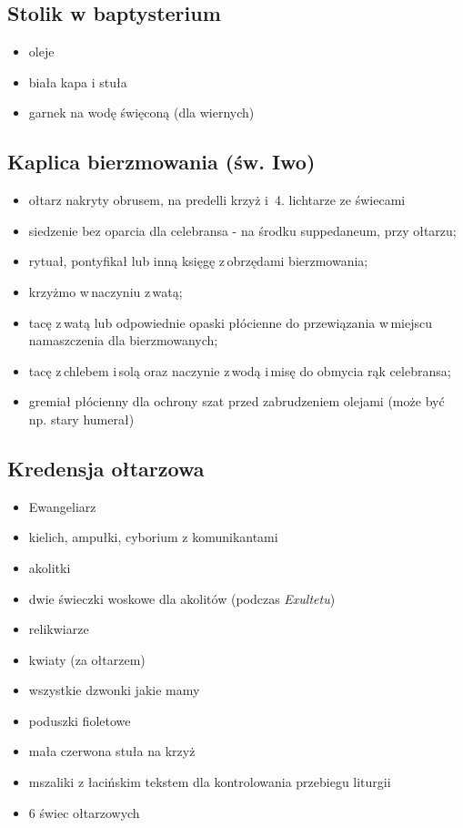 \subsection{Stolik w baptysterium}
\begin{itemize}
	\item oleje
	\item biała kapa i stuła
	\item garnek na wodę święconą (dla wiernych)
\end{itemize}

\subsection{Kaplica bierzmowania (św. Iwo)}
\begin{itemize}
	\item ołtarz nakryty obrusem, na predelli krzyż i  4. lichtarze ze świecami
	\item siedzenie bez oparcia dla celebransa - na środku suppedaneum, przy
	      ołtarzu;
	\item rytuał, pontyfikał lub inną księgę z obrzędami bierzmowania;
	\item krzyżmo w naczyniu z watą;
	\item tacę z watą lub odpowiednie opaski płócienne do przewiązania w miejscu
	      namaszczenia dla bierzmowanych;
	\item tacę z chlebem i solą oraz naczynie z wodą i misę do obmycia rąk
	      celebransa;
	\item gremiał płócienny dla ochrony szat przed zabrudzeniem olejami (może
	      być np. stary humerał)
\end{itemize}

\subsection{Kredensja ołtarzowa}
\begin{itemize}
	\item Ewangeliarz
	\item kielich, ampułki, cyborium z komunikantami
	\item akolitki
	\item dwie świeczki woskowe dla akolitów (podczas \textit{Exultetu})
	\item relikwiarze
	\item kwiaty (za ołtarzem)
	\item wszystkie dzwonki jakie mamy
	\item poduszki fioletowe
	\item mała czerwona stuła na krzyż
	\item mszaliki z łacińskim tekstem dla kontrolowania przebiegu liturgii
	\item 6 świec ołtarzowych
\end{itemize}

